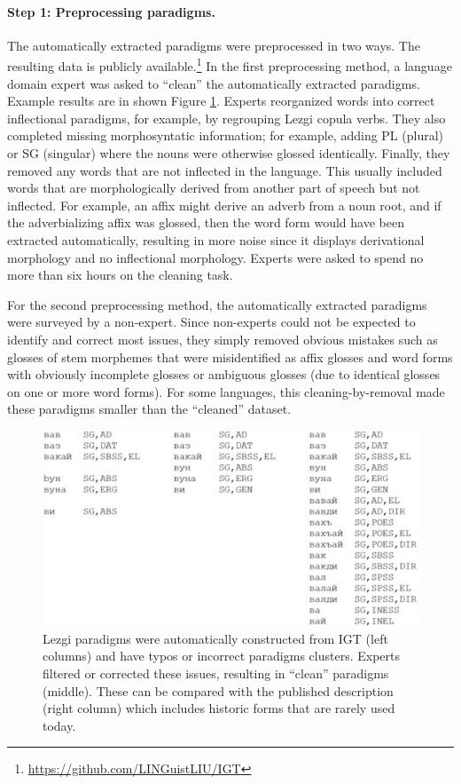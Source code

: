 \paragraph{Step 1: Preprocessing paradigms.}
The automatically extracted paradigms were preprocessed in two ways. The resulting data is publicly available.\footnote{\url{https://github.com/LINGuistLIU/IGT}}
In the first preprocessing method, a language domain expert was asked to ``clean'' the automatically extracted paradigms. Example results are in shown Figure \ref{fig:cleaning}. Experts reorganized words into correct inflectional paradigms, for example, by regrouping Lezgi copula verbs. They also completed missing morphosyntatic information; for example, adding PL (plural) or SG (singular) where the nouns were otherwise glossed identically. Finally, they removed any words that are not inflected in the language. This usually included words that are morphologically derived from another part of speech but not inflected. For example, an affix might derive an adverb from a noun root, and if the adverbializing affix was glossed, then the word form would have been extracted automatically, resulting in more noise since it displays derivational morphology and no inflectional morphology. Experts were asked to spend no more than six hours on the cleaning task. 

For the second preprocessing method, the automatically extracted paradigms were surveyed by a non-expert. Since non-experts could not be expected to identify and correct most issues, they simply removed obvious mistakes such as glosses of stem morphemes that were misidentified as affix glosses and word forms with obviously incomplete glosses or ambiguous glosses (due to identical glosses on one or more word forms). For some languages, this cleaning-by-removal made these paradigms smaller than the ``cleaned'' dataset.  

\begin{figure}
    \centering
    \includegraphics[width=13cm]{figs/IGT2P-paradigms.pdf}
    \caption[Noisy to Clean Paradigms]{Lezgi paradigms were automatically constructed from IGT (left columns) and have typos or incorrect paradigms clusters. Experts filtered or corrected these issues, resulting in ``clean'' paradigms (middle). These can be compared with the published description (right column) which includes historic forms that are rarely used today.}
    \label{fig:cleaning}
\end{figure}

